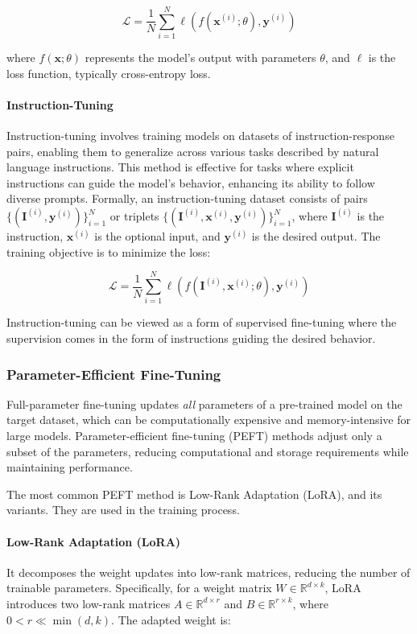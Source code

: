 \documentclass[11pt, onecolumn]{article}
\newcounter{para}
\begin{document}
\[
\mathcal{L} = \frac{1}{N} \sum_{i=1}^N \ell(f(\mathbf{x}^{(i)}; \theta), \mathbf{y}^{(i)})
\]

where \( f(\mathbf{x}; \theta) \) represents the model's output with parameters \( \theta \), and \( \ell \) is the loss function, typically cross-entropy loss.

\paragraph{Instruction-Tuning}

Instruction-tuning involves training models on datasets of instruction-response pairs, enabling them to generalize across various tasks described by natural language instructions. This method is effective for tasks where explicit instructions can guide the model's behavior, enhancing its ability to follow diverse prompts. Formally, an instruction-tuning dataset consists of pairs \( \{(\mathbf{I}^{(i)}, \mathbf{y}^{(i)})\}_{i=1}^N \) or triplets \( \{(\mathbf{I}^{(i)}, \mathbf{x}^{(i)}, \mathbf{y}^{(i)})\}_{i=1}^N \), where \( \mathbf{I}^{(i)} \) is the instruction, \( \mathbf{x}^{(i)} \) is the optional input, and \( \mathbf{y}^{(i)} \) is the desired output. The training objective is to minimize the loss:

\[
\mathcal{L} = \frac{1}{N} \sum_{i=1}^N \ell(f(\mathbf{I}^{(i)}, \mathbf{x}^{(i)}; \theta), \mathbf{y}^{(i)})
\]

Instruction-tuning can be viewed as a form of supervised fine-tuning where the supervision comes in the form of instructions guiding the desired behavior.

\subsubsection{Parameter-Efficient Fine-Tuning}
Full-parameter fine-tuning updates \textit{all} parameters of a pre-trained model on the target dataset, which can be computationally expensive and memory-intensive for large models. Parameter-efficient fine-tuning (PEFT) methods adjust only a subset of the parameters, reducing computational and storage requirements while maintaining performance.

The most common PEFT method is Low-Rank Adaptation (LoRA), and its variants. They are used in the training process.

\paragraph{Low-Rank Adaptation (LoRA)}
It decomposes the weight updates into low-rank matrices, reducing the number of trainable parameters. Specifically, for a weight matrix \( W \in \mathbb{R}^{d \times k} \), LoRA introduces two low-rank matrices \( A \in \mathbb{R}^{d \times r} \) and \( B \in \mathbb{R}^{r \times k} \), where \( 0 < r \ll \min(d, k) \). The adapted weight is:
\end{document}
